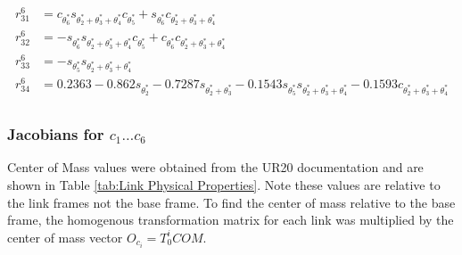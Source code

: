 \documentclass[journal]{new-aiaa}
\begin{document}
\begin{description}
\begin{align*}
        r_{31}^6 &= c_{\theta^*_6}s_{\theta^*_2+\theta^*_3+\theta^*_4}c_{\theta^*_5}+s_{\theta^*_6}c_{\theta^*_2+\theta^*_3+\theta^*_4} \\
        r_{32}^6 &= -s_{\theta^*_6}s_{\theta^*_2+\theta^*_3+\theta^*_4}c_{\theta^*_5}+c_{\theta^*_6}c_{\theta^*_2+\theta^*_3+\theta^*_4} \\
        r_{33}^6 &= -s_{\theta_5^*}s_{\theta_2^*+\theta_3^*+\theta_4^*} \\
        r_{34}^6 &= 0.2363-0.862 s_{\theta_2^*} -0.7287 s_{\theta_2^*+\theta_3^*} - 0.1543 s_{\theta^*_5}s_{\theta_2^*+\theta_3^*+\theta_4^*} - 0.1593 c_{\theta_2^*+\theta_3^*+\theta_4^*} \\
    \end{align*}

\end{description}

\subsubsection{Jacobians for $c_1 \dots c_6$}\label{sec:Equations of Motion:Jacobians}

Center of Mass values were obtained from the UR20 documentation \cite{UR20DH} and are shown in Table \ref{tab:Link Physical Properties}.
Note these values are relative to the link frames not the base frame.
To find the center of mass relative to the base frame, the homogenous transformation matrix for each link was multiplied by the center of mass vector $O_{c_i}=T_0^i COM$.
\end{document}
